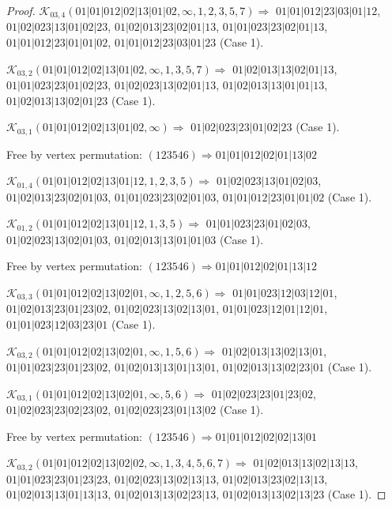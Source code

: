 \documentclass[12pt]{article}
\theoremstyle{plain}
\theoremstyle{definition}
\theoremstyle{remark}
\newcommand{\fancy}[1]{\mathcal{#1}}
\def\K{\fancy{K}}
\begin{document}
\begin{proof}
	\bigskip
	
	$\K_{03,4}(01|01|012|02|13|01|02,\infty,1, 2, 3, 5, 7)\Rightarrow $ $01|01|012|23|03|01|12$, $01|02|023|13|01|02|23$, $01|02|013|23|02|01|13$, $01|01|023|23|02|01|13$, $01|01|012|23|01|01|02$, $01|01|012|23|03|01|23$ (Case 1).
	
	$\K_{03,2}(01|01|012|02|13|01|02,\infty,1, 3, 5, 7)\Rightarrow $ $01|02|013|13|02|01|13$, $01|01|023|23|01|02|23$, $01|02|023|13|02|01|13$, $01|02|013|13|01|01|13$, $01|02|013|13|02|01|23$ (Case 1).
	
	$\K_{03,1}(01|01|012|02|13|01|02,\infty)\Rightarrow $ $01|02|023|23|01|02|23$ (Case 1).
	
	
	
	Free by vertex permutation: $(1 2 3 5 4 6)\Rightarrow 01|01|012|02|01|13|02$
	
	
	
	\bigskip
	
	$\K_{01,4}(01|01|012|02|13|01|12,1, 2, 3, 5)\Rightarrow $ $01|02|023|13|01|02|03$, $01|02|013|23|02|01|03$, $01|01|023|23|02|01|03$, $01|01|012|23|01|01|02$ (Case 1).
	
	$\K_{01,2}(01|01|012|02|13|01|12,1, 3, 5)\Rightarrow $ $01|01|023|23|01|02|03$, $01|02|023|13|02|01|03$, $01|02|013|13|01|01|03$ (Case 1).
	
	
	
	Free by vertex permutation: $(1 2 3 5 4 6)\Rightarrow 01|01|012|02|01|13|12$
	
	
	
	\bigskip
	
	$\K_{03,3}(01|01|012|02|13|02|01,\infty,1, 2, 5, 6)\Rightarrow $ $01|01|023|12|03|12|01$, $01|02|013|23|01|23|02$, $01|02|023|13|02|13|01$, $01|01|023|12|01|12|01$, $01|01|023|12|03|23|01$ (Case 1).
	
	$\K_{03,2}(01|01|012|02|13|02|01,\infty,1, 5, 6)\Rightarrow $ $01|02|013|13|02|13|01$, $01|01|023|23|01|23|02$, $01|02|013|13|01|13|01$, $01|02|013|13|02|23|01$ (Case 1).
	
	$\K_{03,1}(01|01|012|02|13|02|01,\infty,5, 6)\Rightarrow $ $01|02|023|23|01|23|02$, $01|02|023|23|02|23|02$, $01|02|023|23|01|13|02$ (Case 1).
	
	
	
	Free by vertex permutation: $(1 2 3 5 4 6)\Rightarrow 01|01|012|02|02|13|01$
	
	
	
	\bigskip
	
	$\K_{03,2}(01|01|012|02|13|02|02,\infty,1, 3, 4, 5, 6, 7)\Rightarrow $ $01|02|013|13|02|13|13$, $01|01|023|23|01|23|23$, $01|02|023|13|02|13|13$, $01|02|013|23|02|13|13$, $01|02|013|13|01|13|13$, $01|02|013|13|02|23|13$, $01|02|013|13|02|13|23$ (Case 1).
	

\end{proof}
\end{document}
